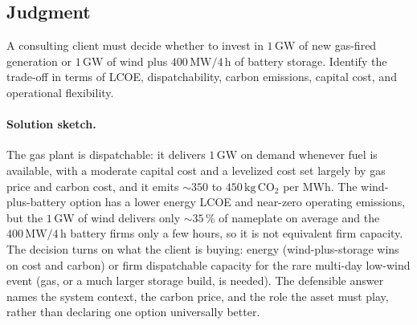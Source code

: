 \subsection*{Judgment}

\begin{exercise}
A consulting client must decide whether to invest in $1\,\si{\giga
\watt}$ of new gas-fired generation or $1\,\si{\giga\watt}$ of wind
plus $400\,\si{\mega\watt}/4\,\si{\hour}$ of battery storage.
Identify the trade-off in terms of LCOE, dispatchability, carbon
emissions, capital cost, and operational flexibility.
\paragraph{Solution sketch.}
The gas plant is dispatchable: it delivers $1\,\si{\giga\watt}$ on
demand whenever fuel is available, with a moderate capital cost and a
levelized cost set largely by gas price and carbon cost, and it emits
$\sim 350$ to $450\,\si{\kilogram}\,\text{CO}_2$ per MWh. The
wind-plus-battery option has a lower energy LCOE and near-zero
operating emissions, but the $1\,\si{\giga\watt}$ of wind delivers only
$\sim 35\,\%$ of nameplate on average and the $400\,\si{\mega\watt}/4\,
\si{\hour}$ battery firms only a few hours, so it is not equivalent
firm capacity. The decision turns on what the client is buying: energy
(wind-plus-storage wins on cost and carbon) or firm dispatchable
capacity for the rare multi-day low-wind event (gas, or a much larger
storage build, is needed). The defensible answer names the system
context, the carbon price, and the role the asset must play, rather
than declaring one option universally better.
\end{exercise}

